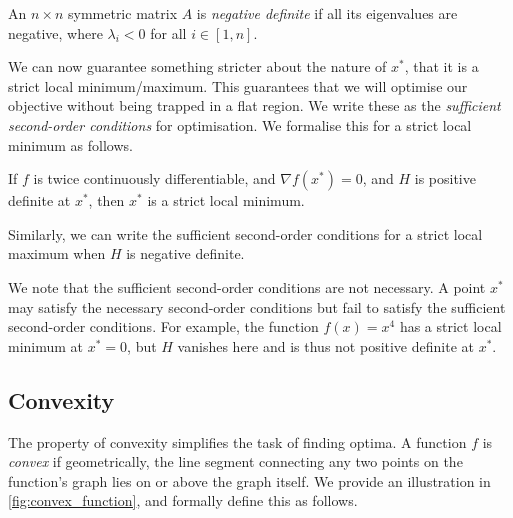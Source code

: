 \begin{definition}

    An $n \times n$ symmetric matrix $A$ is \textit{negative definite} if all its eigenvalues are negative, where $\lambda_i < 0$ for all $i \in [1, n]$.

\end{definition}



We can now guarantee something stricter about the nature of $x^*$, that it is a strict local minimum/maximum. This guarantees that we will optimise our objective without being trapped in a flat region. We write these as the \textit{sufficient second-order conditions} for optimisation. We formalise this for a strict local minimum as follows.

\begin{definition}

    If $f$ is twice continuously differentiable, and $\nabla f(x^*) = 0$, and $H$ is positive definite at $x^*$, then $x^*$ is a strict local minimum.

\end{definition}

Similarly, we can write the sufficient second-order conditions for a strict local maximum when $H$ is negative definite.



We note that the sufficient second-order conditions are not necessary. A point $x^*$ may satisfy the necessary second-order conditions but fail to satisfy the sufficient second-order conditions. For example, the function $f(x) = x^4$ has a strict local minimum at $x^* = 0$, but $H$ vanishes here and is thus not positive definite at $x^*$. 



\subsection{Convexity}

\label{ssec:convexity}



The property of convexity simplifies the task of finding optima. A function $f$ is \textit{convex} if geometrically, the line segment connecting any two points on the function's graph lies on or above the graph itself. We provide an illustration in \cref{fig:convex_function}, and formally define this as follows.



